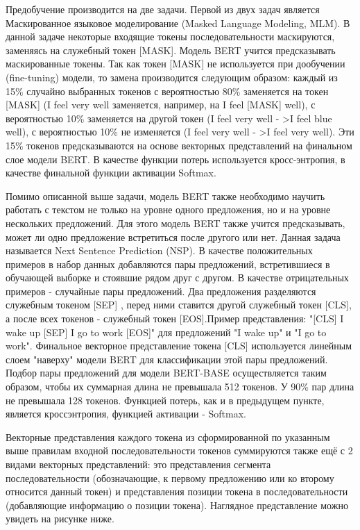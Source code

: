 Предобучение производится на две задачи. Первой из двух задач является Маскированное языковое моделирование (Masked Language Modeling, MLM). В данной задаче некоторые входящие токены последовательности маскируются, заменяясь на служебный токен [MASK]. Модель BERT учится предсказывать маскированные токены. Так как токен [MASK] не используется при дообучении (fine-tuning) модели, то замена производится следующим образом: каждый из 15\% случайно выбранных токенов с вероятностью 80\% заменяется на токен [MASK] (I feel very well заменяется, например, на I feel [MASK] well), с вероятностью 10\% заменяется на другой токен (I feel very well - >I feel blue well), с вероятностью 10\% не изменяется (I feel very well - >I feel very well). Эти 15\% токенов предсказываются на основе векторных представлений на финальном слое модели BERT. В качестве функции потерь используется кросс-энтропия, в качестве финальной функции активации Softmax. 

Помимо описанной выше задачи, модель BERT также необходимо научить работать с текстом не только на уровне одного предложения, но и на уровне нескольких предложений. Для этого модель BERT также учится предсказывать, может ли одно предложение встретиться после другого или нет. Данная задача называется Next Sentence Prediction (NSP). В качестве положительных примеров в набор данных добавляются пары предложений, встретившиеся в обучающей выборке и стоявшие рядом друг с другом. В качестве отрицательных примеров - случайные пары предложений.  Два предложения разделяются служебным токеном [SEP] , перед ними ставится другой служебный токен [CLS], а после всех токенов - служебный токен [EOS].Пример представления: "[CLS] I wake up [SEP] I go to work [EOS]" для предложений "I wake up" и  "I go to work". Финальное векторное представление токена [CLS] используется линейным слоем "наверху" модели BERT для классификации этой пары предложений. Подбор пары предложений для модели BERT-BASE осуществляется таким образом, чтобы их суммарная длина не превышала 512 токенов. У 90\% пар длина не превышала 128 токенов. Функцией потерь, как и в предыдущем пункте, является кроссэнтропия, функцией активации - Softmax.

Векторные представления каждого токена из сформированной по указанным выше правилам входной последовательности токенов суммируются также ещё с 2 видами векторных представлений: это представления сегмента последовательности (обозначающие, к первому предложению или ко второму относится данный токен) и представления позиции токена в последовательности (добавляющие информацию о позиции токена). Наглядное представление можно увидеть на рисунке ниже. 

